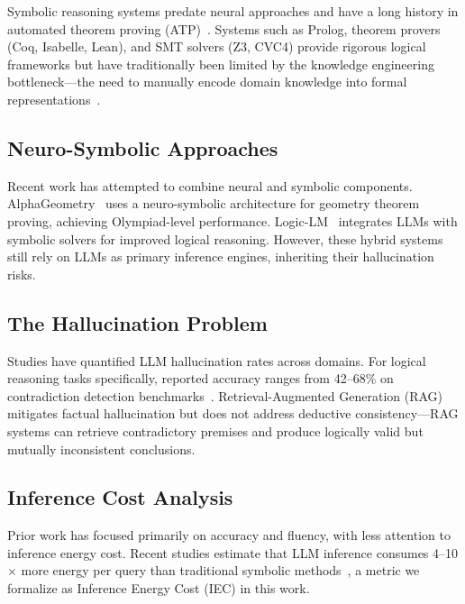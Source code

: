 \documentclass[11pt,a4paper]{article}
\begin{document}
Symbolic reasoning systems predate neural approaches and have a long history in automated theorem proving (ATP)~\cite{newell1976symbolic,demoura2008z3}. Systems such as Prolog, theorem provers (Coq, Isabelle, Lean), and SMT solvers (Z3, CVC4) provide rigorous logical frameworks but have traditionally been limited by the knowledge engineering bottleneck---the need to manually encode domain knowledge into formal representations~\cite{davis2015commonsense}.

\subsection{Neuro-Symbolic Approaches}

Recent work has attempted to combine neural and symbolic components. AlphaGeometry~\cite{trinh2024geometry} uses a neuro-symbolic architecture for geometry theorem proving, achieving Olympiad-level performance. Logic-LM~\cite{pan2023logiclm} integrates LLMs with symbolic solvers for improved logical reasoning. However, these hybrid systems still rely on LLMs as primary inference engines, inheriting their hallucination risks.

\subsection{The Hallucination Problem}

Studies have quantified LLM hallucination rates across domains. For logical reasoning tasks specifically, reported accuracy ranges from 42--68\% on contradiction detection benchmarks~\cite{valmeekam2023planning,bang2023multitask}. Retrieval-Augmented Generation (RAG)~\cite{lewis2020rag} mitigates factual hallucination but does not address deductive consistency---RAG systems can retrieve contradictory premises and produce logically valid but mutually inconsistent conclusions.

\subsection{Inference Cost Analysis}

Prior work has focused primarily on accuracy and fluency, with less attention to inference energy cost. Recent studies estimate that LLM inference consumes 4--10$\times$ more energy per query than traditional symbolic methods~\cite{patterson2021carbon}, a metric we formalize as Inference Energy Cost (IEC) in this work.

\end{document}
